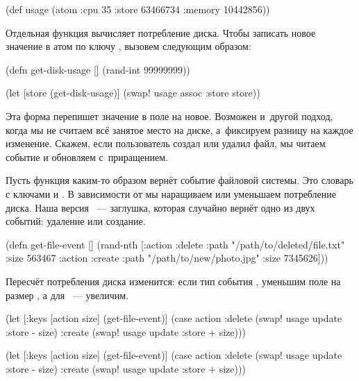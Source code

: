 \begin{clojure}
(def usage
  (atom {:cpu 35
         :store 63466734
         :memory 10442856}))
\end{clojure}

Отдельная функция вычисляет потребление диска. Чтобы записать новое значение в
атом по ключу , вызовем  следующим образом:

\begin{clojure}
(defn get-disk-usage []
  (rand-int 99999999))

(let [store (get-disk-usage)]
  (swap! usage assoc :store store))
\end{clojure}

Эта форма перепишет значение в поле  на новое. Возможен и~другой
подход, когда мы не считаем всё занятое место на диске, а~фиксируем разницу на
каждое изменение. Скажем, если пользователь создал или удалил файл, мы читаем
событие и обновляем  с~приращением.

Пусть функция  каким-то образом вернёт событие файловой
системы. Это словарь с ключами  и . В зависимости от
 мы наращиваем или уменьшаем потребление диска. Наша версия
~--- заглушка, которая случайно вернёт одно из двух
событий: удаление или создание.

\begin{clojure}
(defn get-file-event []
  (rand-nth
   [{:action :delete
     :path "/path/to/deleted/file.txt"
     :size 563467}
    {:action :create
     :path "/path/to/new/photo.jpg"
     :size 7345626}]))
\end{clojure}

Пересчёт потребления диска изменится: если тип события , уменьшим
поле  на размер , а для ~--- увеличим.

\ifnarrow

\begin{clojure}
(let [{:keys [action size]}
      (get-file-event)]
  (case action
    :delete
    (swap! usage update :store - size)
    :create
    (swap! usage update :store + size)))
\end{clojure}

\else

\begin{clojure}
(let [{:keys [action size]} (get-file-event)]
  (case action
    :delete
    (swap! usage update :store - size)
    :create
    (swap! usage update :store + size)))
\end{clojure}

